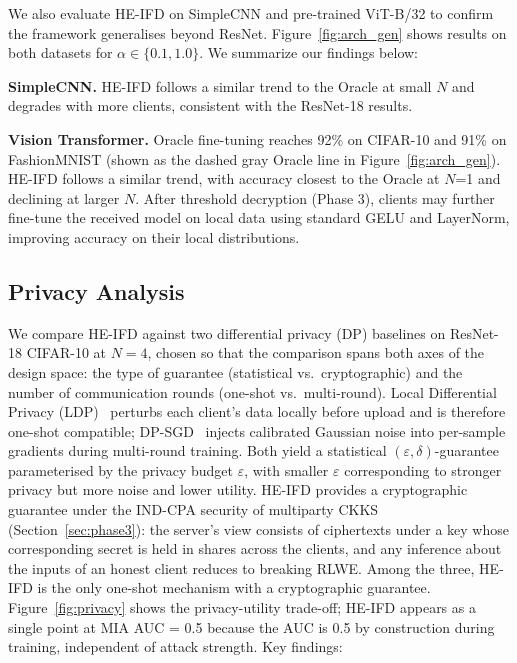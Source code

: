 
We also evaluate HE-IFD on SimpleCNN and pre-trained ViT-B/32 to confirm the framework generalises beyond ResNet. Figure~\ref{fig:arch_gen} shows results on both datasets for $\alpha \in \{0.1, 1.0\}$. We summarize our findings below: 

\textbf{SimpleCNN.} HE-IFD follows a similar trend to the Oracle at small $N$ and degrades with more clients, consistent with the ResNet-18 results.

\textbf{Vision Transformer.} Oracle fine-tuning reaches 92\% on CIFAR-10 and 91\% on FashionMNIST (shown as the dashed gray Oracle line in Figure~\ref{fig:arch_gen}). HE-IFD follows a similar trend, with accuracy closest to the Oracle at $N$=1 and declining at larger $N$. After threshold decryption (Phase 3), clients may further fine-tune the received model on local data using standard GELU and LayerNorm, improving accuracy on their local distributions.


\subsection{Privacy Analysis}
\label{sec:dp_comparison}

We compare HE-IFD against two differential privacy (DP) baselines on ResNet-18 CIFAR-10 at $N{=}4$, chosen so that the comparison spans both axes of the design space: the type of guarantee (statistical vs.\ cryptographic) and the number of communication rounds (one-shot vs.\ multi-round). Local Differential Privacy (LDP)~\cite{kasiviswanathan2011can} perturbs each client's data locally before upload and is therefore one-shot compatible; DP-SGD~\cite{abadi2016deep} injects calibrated Gaussian noise into per-sample gradients during multi-round training. Both yield a statistical $(\varepsilon, \delta)$-guarantee parameterised by the privacy budget $\varepsilon$, with smaller $\varepsilon$ corresponding to stronger privacy but more noise and lower utility. HE-IFD provides a cryptographic guarantee under the IND-CPA security of multiparty CKKS (Section~\ref{sec:phase3}): the server's view consists of ciphertexts under a key whose corresponding secret is held in shares across the clients, and any inference about the inputs of an honest client reduces to breaking RLWE. Among the three, HE-IFD is the only one-shot mechanism with a cryptographic guarantee. Figure~\ref{fig:privacy} shows the privacy-utility trade-off; HE-IFD appears as a single point at MIA AUC = 0.5 because the AUC is 0.5 by construction during training, independent of attack strength. Key findings:

